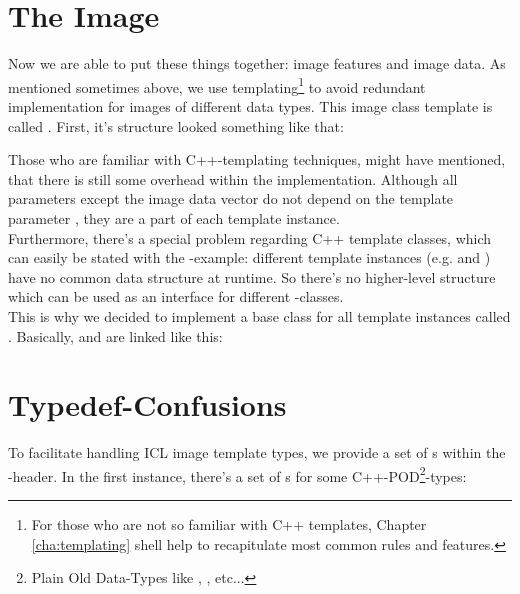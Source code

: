 \section{The Image}
Now we are able to put these things together: image features and image data. As mentioned sometimes above, we use templating\footnote{For those who are not so familiar with C++ templates, Chapter \ref{cha:templating} shell help to recapitulate most common rules and features.} to avoid redundant implementation for images of different data types. This image class template is called  . First, it's structure looked something like that:


Those who are familiar with C++-templating techniques, might have mentioned, that there is still some overhead within the implementation. Although all parameters except the image data vector do not depend on the template parameter , they are a part of each template instance.\\
Furthermore, there's a special problem regarding C++ template classes, which can easily be stated with the -example: different template instances (e.g.  and ) have no common data structure at runtime. So there's no higher-level structure which can be used as an interface for different -classes.\\
This is why we decided to implement a base class for all  template instances called  . Basically,  and  are linked like this:



\section{Typedef-Confusions\label{sec:typedef-confusions}}
To facilitate handling ICL image template types, we provide a set of s within the -header. In the first instance, there's a set of s for some C++-POD\footnote{Plain Old Data-Types like , ,  etc...}-types:


